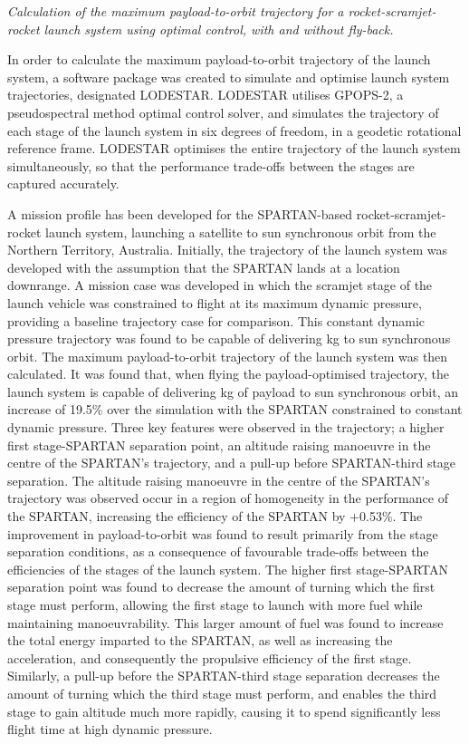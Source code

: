 	\vspace{10pt}
\emph{Calculation of the maximum payload-to-orbit trajectory for a rocket-scramjet-rocket launch system using optimal control, with and without fly-back.}

In order to calculate the maximum payload-to-orbit trajectory of the launch system, a software package was created to simulate and optimise launch system trajectories, designated LODESTAR. LODESTAR utilises GPOPS-2, a pseudospectral method optimal control solver, and simulates the trajectory of each stage of the launch system in six degrees of freedom, in a geodetic rotational reference frame. 
LODESTAR optimises the entire trajectory of the launch system simultaneously, so that the performance trade-offs between the stages are captured accurately.

A mission profile has been developed for the SPARTAN-based rocket-scramjet-rocket launch system, launching a satellite to sun synchronous orbit from the Northern Territory, Australia. 
Initially, the trajectory of the launch system was developed with the assumption that the SPARTAN lands at a location downrange.
A mission case was developed in which the scramjet stage of the launch vehicle was constrained to flight at its maximum dynamic pressure, providing a baseline trajectory case for comparison. This constant dynamic pressure trajectory was found to be capable of delivering \PayloadToOrbitConstqNoReturn kg to sun synchronous orbit. 
The maximum payload-to-orbit trajectory of the launch system was then calculated. It was found that, when flying the payload-optimised trajectory, the launch system is capable of delivering \PayloadToOrbitStandardNoReturn kg of payload to sun synchronous orbit, an increase of 19.5\% over the simulation with the SPARTAN constrained to constant dynamic pressure. 
Three key features were observed in the trajectory; a higher first stage-SPARTAN separation point, an altitude raising manoeuvre in the centre of the SPARTAN's trajectory, and a pull-up before SPARTAN-third stage separation.
The altitude raising manoeuvre in the centre of the SPARTAN's trajectory was observed occur in a region of homogeneity in the performance of the SPARTAN, increasing the efficiency of the SPARTAN by +0.53\%. 
The improvement in payload-to-orbit was found to result primarily from the stage separation conditions, as a consequence of favourable trade-offs between the efficiencies of the stages of the launch system.
The higher first stage-SPARTAN separation point was found to decrease the amount of turning which the first stage must perform, allowing the first stage to launch with more fuel while maintaining manoeuvrability. This larger amount of fuel was found to increase the total energy imparted to the SPARTAN, as well as increasing the acceleration, and consequently the propulsive efficiency of the first stage. Similarly, a pull-up before the SPARTAN-third stage separation decreases the amount of turning which the third stage must perform, and enables the third stage to gain altitude much more rapidly, causing it to spend significantly less flight time at high dynamic pressure. 

